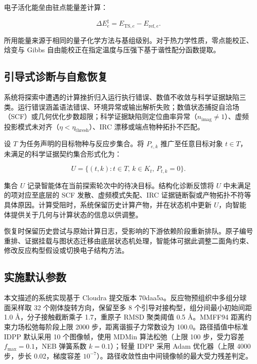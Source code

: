 电子活化能垒由驻点能量差计算：

\begin{equation}\label{eq:methods-14}
\Delta E_e^\ddagger=E_{\mathrm{TS},e}-E_{\mathrm{ref},e}.
\end{equation}

所用能量来源于相同的量子化学方法与基组级别。对于热力学性质，零点能校正、焓变与 Gibbs 自由能校正在指定温度与压强下基于谐性配分函数提取。

\subsection{引导式诊断与自愈恢复}
系统将探索中遭遇的计算挫折归入运行执行错误、数值不收敛与科学证据缺陷三类。运行错误涵盖语法错误、环境异常或输出解析失败；数值状态捕捉自洽场（SCF）或几何优化步数超限；科学证据缺陷则定位曲率异常（$n_{\mathrm{imag}}\ne 1$）、虚频投影模式未对齐（$\eta<\eta_{\mathrm{thresh}}$）、IRC 漂移或端点物种拓扑不匹配。

设 $T$ 为任务声明的目标物种与反应步集合。将 $P_{e,k}$ 推广至任意目标对象 $t\in T$，未满足的科学证据契约集合形式化为：

\begin{equation}\label{eq:methods-15}
U=\{(t,k):t\in T,\, k\in K_t,\, P_{t,k}=0\}.
\end{equation}

集合 $U$ 记录智能体在当前探索轮次中的待决目标。结构化诊断反馈将 $U$ 中未满足的项对应至底层的 SCF 发散、虚频模式失配、IRC 证据链断裂或产物拓扑不符等具体原因。计算受阻时，系统保留历史计算产物，并在状态机中更新 $U$，向智能体提供关于几何与计算状态的信息以供调整。

恢复时保留历史尝试与原始计算日志，受影响的下游依赖阶段重新排队。原子编号重排、证据挂载与图状态迁移由底层状态机处理，智能体可据此调整二面角约束、修改反应构型假设或切换电子结构方法。

\subsection{实施默认参数}
本文描述的系统实现基于 Cloudra 提交版本 70daa5a。反应物预组织中多组分球面采样取 32 个刚体旋转方向，保留至多 8 个引导对接构型，组分间最小初始间距 1.0 Å，分子接触截断乘子 1.7，重原子 RMSD 聚类阈值 0.5 Å。MMFF94 距离约束力场松弛每阶段上限 2000 步，距离谐振子力常数设为 100.0。路径插值中标准 IDPP 默认采用 10 个图像帧，使用 MDMin 算法松弛（上限 100 步，受力容差 $f_{\max}=0.1$，NEB 弹簧系数 $k=0.1$）；轻量 IDPP 采用 Adam 优化器（上限 4000 步，步长 0.02，梯度容差 $10^{-7}$）。路径收敛性由中间镜像帧的最大受力残差判定。

